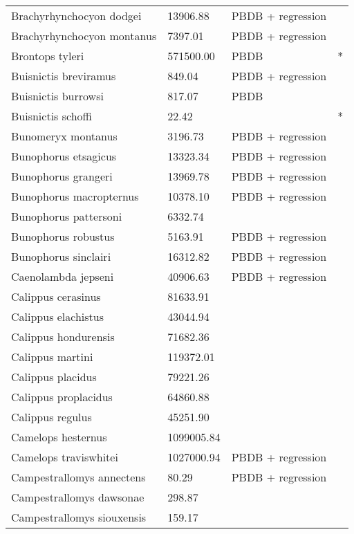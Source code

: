 \documentclass{article}
\begin{document}
\begin{center}
\begin{longtable}{p{} p{} p{} p{}}
    Brachyrhynchocyon dodgei & 13906.88 & PBDB + regression &  \\ 
    Brachyrhynchocyon montanus & 7397.01 & PBDB + regression &  \\ 
    Brontops tyleri & 571500.00 & PBDB & * \\ 
    Buisnictis breviramus & 849.04 & PBDB + regression &  \\ 
    Buisnictis burrowsi & 817.07 & PBDB &  \\ 
    Buisnictis schoffi & 22.42 & \cite{Tomiya2013} & * \\ 
    Bunomeryx montanus & 3196.73 & PBDB + regression &  \\ 
    Bunophorus etsagicus & 13323.34 & PBDB + regression &  \\ 
    Bunophorus grangeri & 13969.78 & PBDB + regression &  \\ 
    Bunophorus macropternus & 10378.10 & PBDB + regression &  \\ 
    Bunophorus pattersoni & 6332.74 & \cite{Macdonald1956} &  \\ 
    Bunophorus robustus & 5163.91 & PBDB + regression &  \\ 
    Bunophorus sinclairi & 16312.82 & PBDB + regression &  \\ 
    Caenolambda jepseni & 40906.63 & PBDB + regression &  \\ 
    Calippus cerasinus & 81633.91 & \cite{Tomiya2013} &  \\ 
    Calippus elachistus & 43044.94 & \cite{Tomiya2013} &  \\ 
    Calippus hondurensis & 71682.36 & \cite{Tomiya2013} &  \\ 
    Calippus martini & 119372.01 & \cite{Tomiya2013} &  \\ 
    Calippus placidus & 79221.26 & \cite{Tomiya2013} &  \\ 
    Calippus proplacidus & 64860.88 & \cite{Tomiya2013} &  \\ 
    Calippus regulus & 45251.90 & \cite{Tomiya2013} &  \\ 
    Camelops hesternus & 1099005.84 & \cite{Smith2004} &  \\ 
    Camelops traviswhitei & 1027000.94 & PBDB + regression &  \\ 
    Campestrallomys annectens & 80.29 & PBDB + regression &  \\ 
    Campestrallomys dawsonae & 298.87 & \cite{Tomiya2013} &  \\ 
    Campestrallomys siouxensis & 159.17 & \cite{Tomiya2013} &  \\ 

\end{longtable}
\end{center}
\end{document}
